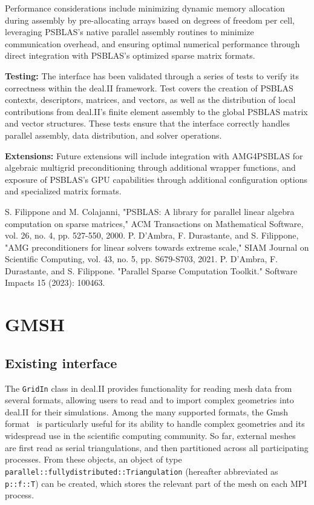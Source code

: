 \documentclass[a4paper,12pt]{article}
\begin{document}
Performance considerations include minimizing dynamic memory allocation
during assembly by pre-allocating arrays based on degrees of freedom per cell,
leveraging PSBLAS's native parallel assembly routines to minimize communication
overhead, and ensuring optimal numerical performance through direct
integration with PSBLAS's optimized sparse matrix formats.

\textbf{Testing:} The interface has been validated through a series of tests
to verify its correctness within the deal.II framework. Test covers the creation of PSBLAS contexts,
descriptors, matrices, and vectors, as well as the distribution of local contributions
from deal.II's finite element assembly to the global PSBLAS matrix and vector structures.
These tests ensure that the interface correctly handles parallel assembly,
data distribution, and solver operations.

\textbf{Extensions:} Future extensions will include integration with AMG4PSBLAS for algebraic multigrid
preconditioning through additional wrapper functions, and exposure of PSBLAS's GPU capabilities through
additional configuration options and specialized matrix formats.


\begin{thebibliography}{10}
     S. Filippone and M. Colajanni, "PSBLAS: A library for parallel linear algebra computation on sparse matrices," ACM Transactions on Mathematical Software, vol. 26, no. 4, pp. 527-550, 2000.
     P. D'Ambra, F. Durastante, and S. Filippone, "AMG preconditioners for linear solvers towards extreme scale," SIAM Journal on Scientific Computing, vol. 43, no. 5, pp. S679-S703, 2021.
     P. D’Ambra, F. Durastante, and S. Filippone. "Parallel Sparse Computation Toolkit." Software Impacts 15 (2023): 100463.
\end{thebibliography}

\newpage


\section{GMSH}
\label{sec:gmsh}

\subsection{Existing interface}
The \texttt{GridIn} class in deal.II provides functionality for reading
mesh data from several formats, allowing users to read and to import
complex geometries into deal.II for their simulations. Among the many supported formats,
the Gmsh format~\cite{gmsh} is particularly useful for its ability to handle complex geometries
and its widespread use in the scientific computing community. So far, external meshes
are first read as serial triangulations, and then partitioned across all
participating processes. From these objects, an object of type
\texttt{parallel::fullydistributed::Triangulation} (hereafter abbreviated as \texttt{p::f::T}) can be created, which stores
the relevant part of the mesh on each MPI process.
\end{document}
